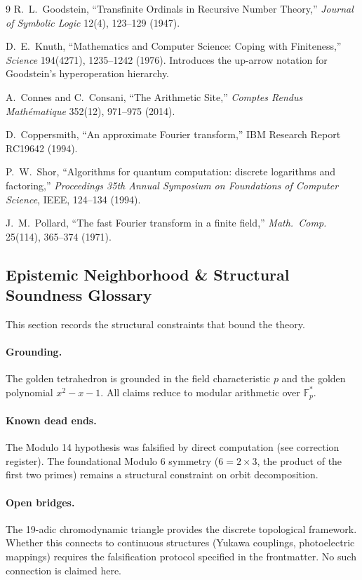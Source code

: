 \begin{thebibliography}{9}
R.~L.~Goodstein,
``Transfinite Ordinals in Recursive Number Theory,''
\emph{Journal of Symbolic Logic} 12(4), 123--129 (1947).

D.~E.~Knuth,
``Mathematics and Computer Science: Coping with Finiteness,''
\emph{Science} 194(4271), 1235--1242 (1976).
Introduces the up-arrow notation for Goodstein's hyperoperation hierarchy.

A.~Connes and C.~Consani,
``The Arithmetic Site,''
\emph{Comptes Rendus Math\'ematique} 352(12), 971--975 (2014).

D.~Coppersmith,
``An approximate Fourier transform,''
IBM Research Report RC19642 (1994).

P.~W.~Shor,
``Algorithms for quantum computation: discrete logarithms and factoring,''
\emph{Proceedings 35th Annual Symposium on Foundations of Computer Science}, IEEE, 124--134 (1994).

J.~M.~Pollard,
``The fast Fourier transform in a finite field,''
\emph{Math.\ Comp.} 25(114), 365--374 (1971).

\end{thebibliography}

\subsection*{Epistemic Neighborhood \& Structural Soundness Glossary}

This section records the structural constraints that bound the theory.

\paragraph{Grounding.} The golden tetrahedron is grounded in the field characteristic $p$ and the golden polynomial $x^2 - x - 1$. All claims reduce to modular arithmetic over $\mathbb{F}_p^*$.

\paragraph{Known dead ends.} The Modulo 14 hypothesis was falsified by direct computation (see correction register). The foundational Modulo 6 symmetry ($6 = 2 \times 3$, the product of the first two primes) remains a structural constraint on orbit decomposition.

\paragraph{Open bridges.} The 19-adic chromodynamic triangle provides the discrete topological framework. Whether this connects to continuous structures (Yukawa couplings, photoelectric mappings) requires the falsification protocol specified in the frontmatter. No such connection is claimed here.
